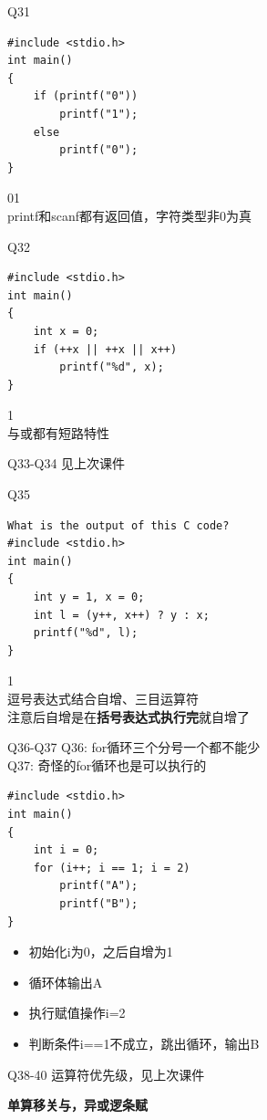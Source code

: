 \documentclass[UTF8]{ctexbeamer}
\begin{document}
\begin{frame}[fragile]{Q31}
\begin{lstlisting}
#include <stdio.h>
int main()
{
    if (printf("0"))
        printf("1");
    else
    	printf("0");
}
\end{lstlisting}
01\\
printf和scanf都有返回值，字符类型非0为真
\end{frame}

\begin{frame}[fragile]{Q32}
\begin{lstlisting}
#include <stdio.h>
int main()
{
    int x = 0;
    if (++x || ++x || x++)
        printf("%d", x);
}
\end{lstlisting}
1\\
与或都有短路特性
\end{frame}

\begin{frame}{Q33-Q34}
见上次课件
\end{frame}

\begin{frame}[fragile]{Q35}
\begin{lstlisting}
What is the output of this C code?
#include <stdio.h>
int main()
{
    int y = 1, x = 0;
    int l = (y++, x++) ? y : x;
    printf("%d", l);
}
\end{lstlisting}
1\\
逗号表达式结合自增、三目运算符\\
注意后自增是在\textbf{括号表达式执行完}就自增了
\end{frame}

\begin{frame}[fragile]{Q36-Q37}
Q36: for循环三个分号一个都不能少\\
Q37: 奇怪的for循环也是可以执行的
\begin{lstlisting}
#include <stdio.h>
int main()
{
    int i = 0;
    for (i++; i == 1; i = 2)
        printf("A");
        printf("B");
}
\end{lstlisting}
\begin{itemize}
	\item 初始化i为0，之后自增为1
	\item 循环体输出A
	\item 执行赋值操作i=2
	\item 判断条件i==1不成立，跳出循环，输出B
\end{itemize}
\end{frame}

\begin{frame}{Q38-40}
运算符优先级，见上次课件\\
\begin{center}
\Large\textbf{单算移关与，异或逻条赋}
\end{center}
\end{frame}
\end{document}

